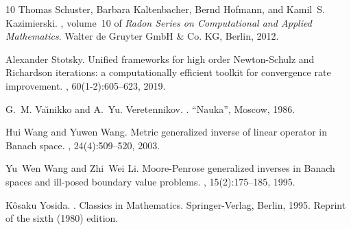 \documentclass[12pt]{amsart}
\theoremstyle{remark}
\begin{document}
\begin{thebibliography}{10}
Thomas Schuster, Barbara Kaltenbacher, Bernd Hofmann, and Kamil~S. Kazimierski.
, volume~10 of {\em
  Radon Series on Computational and Applied Mathematics}.
\newblock Walter de Gruyter GmbH \& Co. KG, Berlin, 2012.

Alexander Stotsky.
\newblock Unified frameworks for high order {N}ewton-{S}chulz and {R}ichardson
  iterations: a computationally efficient toolkit for convergence rate
  improvement.
, 60(1-2):605--623, 2019.

G.~M. Va\u{\i}nikko and A.~Yu. Veretennikov.
.
\newblock ``Nauka'', Moscow, 1986.

Hui Wang and Yuwen Wang.
\newblock Metric generalized inverse of linear operator in {B}anach space.
, 24(4):509--520, 2003.

Yu~Wen Wang and Zhi~Wei Li.
\newblock Moore-{P}enrose generalized inverses in {B}anach spaces and ill-posed
  boundary value problems.
, 15(2):175--185, 1995.

K\^{o}saku Yosida.
.
\newblock Classics in Mathematics. Springer-Verlag, Berlin, 1995.
\newblock Reprint of the sixth (1980) edition.

\end{thebibliography}


%
%
\end{document}
